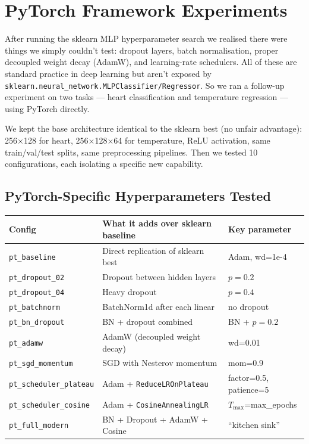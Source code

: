 \documentclass[11pt,a4paper]{article}
\begin{document}
\section{PyTorch Framework Experiments}

After running the sklearn MLP hyperparameter search we realised there were things we simply couldn't test:
dropout layers, batch normalisation, proper decoupled weight decay (AdamW), and learning-rate schedulers.
All of these are standard practice in deep learning but aren't exposed by \texttt{sklearn.neural\_network.MLPClassifier/Regressor}.
So we ran a follow-up experiment on two tasks --- heart classification and temperature regression --- using PyTorch directly.

We kept the base architecture identical to the sklearn best (no unfair advantage): 256$\times$128 for heart, 256$\times$128$\times$64 for temperature, ReLU activation, same train/val/test splits, same preprocessing pipelines.
Then we tested 10 configurations, each isolating a specific new capability.

\subsection{PyTorch-Specific Hyperparameters Tested}

\begin{center}
\small
\begin{tabular}{lll}
\toprule
\textbf{Config} & \textbf{What it adds over sklearn baseline} & \textbf{Key parameter} \\
\midrule
\texttt{pt\_baseline}          & Direct replication of sklearn best & Adam, wd=1e-4 \\
\texttt{pt\_dropout\_02}       & Dropout between hidden layers       & $p=0.2$ \\
\texttt{pt\_dropout\_04}       & Heavy dropout                       & $p=0.4$ \\
\texttt{pt\_batchnorm}         & BatchNorm1d after each linear       & no dropout \\
\texttt{pt\_bn\_dropout}       & BN + dropout combined               & BN + $p=0.2$ \\
\texttt{pt\_adamw}             & AdamW (decoupled weight decay)      & wd=0.01 \\
\texttt{pt\_sgd\_momentum}     & SGD with Nesterov momentum          & mom=0.9 \\
\texttt{pt\_scheduler\_plateau}& Adam + \texttt{ReduceLROnPlateau}  & factor=0.5, patience=5 \\
\texttt{pt\_scheduler\_cosine} & Adam + \texttt{CosineAnnealingLR}  & $T_\text{max}$=max\_epochs \\
\texttt{pt\_full\_modern}      & BN + Dropout + AdamW + Cosine       & ``kitchen sink'' \\
\bottomrule
\end{tabular}
\end{center}
\end{document}
